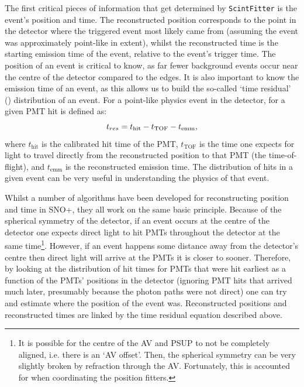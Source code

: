 The first critical pieces of information that get determined by \texttt{ScintFitter} is the event's position and time. The reconstructed position corresponds to the point in the detector where the triggered event most likely came from (assuming the event was approximately point-like in extent), whilst the reconstructed time is the starting emission time of the event, relative to the event's trigger time. The position of an event is critical to know, as far fewer background events occur near the centre of the detector compared to the edges. It is also important to know the emission time of an event, as this allows us to build the so-called `time residual' (\tres{}) distribution of an event. For a point-like physics event in the detector, \tres{} for a given PMT hit is defined as:
\begin{equation}
    t_{res} = t_{\mathrm{hit}} - t_{\mathrm{TOF}} - t_{\mathrm{emm}},
\end{equation}
where $t_{\mathrm{hit}}$ is the calibrated hit time of the PMT, $t_{\mathrm{TOF}}$ is the time one expects for light to travel directly from the reconstructed position to that PMT (the time-of-flight), and $t_{\mathrm{emm}}$ is the reconstructed emission time. The \tres{} distribution of hits in a given event can be very useful in understanding the physics of that event.

Whilst a number of algorithms have been developed for reconstructing position and time in SNO+, they all work on the same basic principle. Because of the spherical symmetry of the detector, if an event occurs at the centre of the detector one expects direct light to hit PMTs throughout the detector at the same time\footnote{It is possible for the centre of the AV and PSUP to not be completely aligned, i.e. there is an `AV offset'. Then, the spherical symmetry can be very slightly broken by refraction through the AV. Fortunately, this is accounted for when coordinating the position fitters.}.
However, if an event happens some distance away from the detector's centre then direct light will arrive at the PMTs it is closer to sooner. Therefore, by looking at the distribution of hit times for PMTs that were hit earliest as a function of the PMTs' positions in the detector (ignoring PMT hits that arrived much later, presumably because the photon paths were not direct) one can try and estimate where the position of the event was. Reconstructed positions and reconstructed times are linked by the time residual equation described above.

